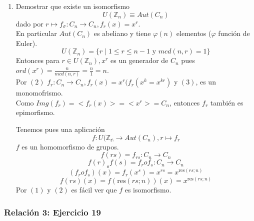 \documentclass[11pt,a4paper]{article}
\begin{document}
\begin{enumerate}[label = $(\arabic*)$]
\item Demostrar que existe un isomorfismo
$$U(\mathbb{Z}_{n}) \equiv Aut(C_{n})$$
dado por $r \mapsto f_{\sigma}: C_{n} \to C_{n}, f_{r}(x) = x^{r}$. \\
En particular $Aut(C_{n})$ es abeliano y tiene $\varphi(n)$ elementos ($\varphi$ función de Euler).
$$U(\mathbb{Z}_{n}) = \{r \mid 1 \leq r \leq n-1 \text{ y } mcd(n,r) = 1\}$$
Entonces para $r \in U(\mathbb{Z}_{n}), x^{r}$ es un generador de $C_{n}$ pues $ord(x^{r}) = \frac{n}{mcd(n,r)} = \frac{n}{1} = n$. \\
Por $(2)$ $f_{r}: C_{n} \to C_{n}, f_{r}(x) = x^{r} (f_{r}(x^{k} = x^{kr})$ y $(3)$, es un monomofrismo. \\
Como $Img(f_{r}) = <f_{r}(x)> = <x^{r}> = C_{n}$, entonces $f_{r}$ también es epimorfismo.

Tenemos pues una aplicación
$$f: U(\mathbb{Z_{n}} \to Aut(C_{n}), r \mapsto f_{r}$$
$f$ es un homomorfismo de grupos.
$$f(rs) = f_{rs}: C_{n} \to C_{n}$$
$$f(r)_{o}f(s) = f_{r} o f_{s}: C_{n} \to C_{n}$$
$$(f_{r} o f_{s})(x) = f_{r}(x^{s}) = x^{rs} = x^{\text{res}(rs;n)}$$
$$f(rs)(x) = f(\text{res}(rs;n))(x) = x^{\text{res}(rs;n)}$$
Por $(1)$ y $(2)$ es fácil ver que $f$ es isomorfismo.
\end{enumerate}

\subsubsection*{Relación 3: Ejercicio 19}
\end{document}
